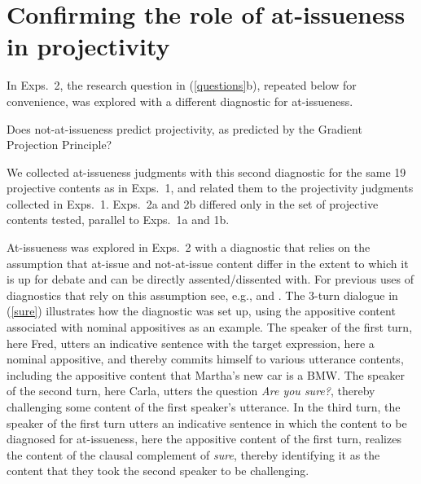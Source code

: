 \documentclass[11pt,fleqn]{article}
\newcommand{\6}{\mbox{$[\hspace*{-.6mm}[$}}
\newcommand{\9}{\mbox{$]\hspace*{-.6mm}]$}}
\begin{document}
\section{Confirming the role of at-issueness in projectivity}\label{s4}

In Exps.~2, the research question in (\ref{questions}b), repeated below for convenience, was explored with a different diagnostic for at-issueness.

\begin{exe}
 Does not-at-issueness predict projectivity, as predicted by the Gradient Projection Principle?
\end{exe}
We collected at-issueness judgments with this second diagnostic for the same 19 projective contents as in Exps.~1, and related them to the projectivity judgments collected in Exps.~1. Exps.~2a and 2b differed only in the set of projective contents tested, parallel to Exps.~1a and 1b. 

At-issueness was explored in Exps.~2 with a diagnostic that relies on the assumption that at-issue and not-at-issue content differ in the extent to which it is up for debate and can be directly assented/dissented with. For previous uses of diagnostics that rely on this assumption see, e.g., \citealt{amaral-etal07,xue-onea11,murray2014,anderbois-etal2015,destruel-etal2015,tonhauser-sula6} and \citealt{syrett-koev2015}. The 3-turn dialogue in (\ref{sure}) illustrates how the diagnostic was set up, using the appositive content associated with nominal appositives as an example. The speaker of the first turn, here Fred, utters an indicative sentence with the target expression, here a nominal appositive, and thereby commits himself to various utterance contents, including the appositive content that Martha's new car is a BMW. The speaker of the second turn, here Carla, utters the question {\em Are you sure?}, thereby challenging some content of the first speaker's utterance. In the third turn, the speaker of the first turn utters an indicative sentence in which the content to be diagnosed for at-issueness, here the appositive content of the first turn, realizes the content of the clausal complement of {\em sure}, thereby identifying it as the content that they took the second speaker to be challenging. 
\end{document}

